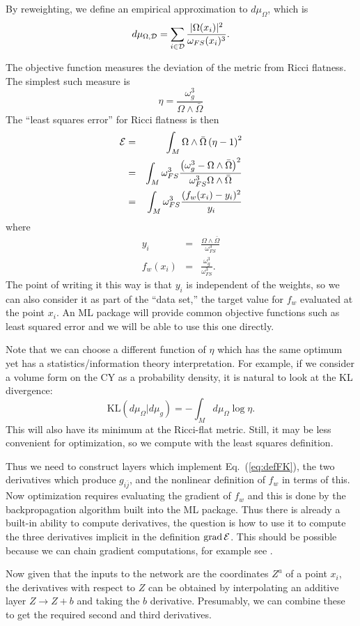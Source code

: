 \documentclass[12pt]{article}
\def\CD {{\cal D}}
\def\CE {{\cal E}}
\newcommand{\eq}[1]{Eq.~(\ref{eq:#1})}
\newcommand{\be}{\begin{equation}}
\newcommand{\ee}{\end{equation}}
\newcommand{\bea}{\begin{eqnarray}}
\newcommand{\eea}{\end{eqnarray}}
\def\bj{{\bar{j}}}
\begin{document}
By reweighting, we define an empirical approximation to $d\mu_\Omega$, which is
\be\label{eq:muOmegaD}
d\mu_{\Omega,\CD} = \sum_{i\in \CD} \frac{ |\Omega(x_i)|^2 }{ \omega_{FS}(x_i)^3 } .
\ee

The objective function measures the deviation of the metric from Ricci flatness.  The simplest such measure
is
\be
\eta = \frac{ \omega_g^3 }{ \Omega\wedge\bar\Omega }
\ee
The ``least squares error'' for Ricci flatness is then
\bea \label{eq:Lquad}
\CE &=& \int_M \Omega\wedge\bar\Omega \left(\eta-1\right)^2 \\
&=& \int_M \omega_{FS}^3 \frac{\left( \omega_g^3-\Omega\wedge\bar\Omega \right)^2 }{ 
\omega_{FS}^3 \Omega\wedge\bar\Omega } \\
&=& \int_M \omega_{FS}^3 \frac{(f_w(x_i) - y_i)^2}{y_i}
\label{eq:cyobj}
\eea
where
\bea
y_i &=& \frac{ \Omega\wedge\bar\Omega }{ \omega_{FS}^3 } \\
f_w(x_i) &=& \frac{ \omega_g^3 }{ \omega_{FS}^3 } .
\eea
The point of writing it this way is that $y_i$ is independent of the weights, so we can also consider
it as part of the ``data set,'' the target value for $f_w$ evaluated at the point $x_i$.  An ML package
will provide common objective functions such as least squared error and we will be able to use this one directly.

Note that we can choose a different function of $\eta$ which has the same optimum yet has
a statistics/information theory interpretation.  For example, if we consider a volume form on the CY as
a probability density, it is natural to look at the KL divergence:
\be \label{eq:KLobj}
\mbox{KL}\left( d\mu_\Omega | d\mu_g \right) = 
-\int_M d\mu_\Omega \log \eta .
\ee
This will also have its minimum at the Ricci-flat metric.
Still, it may be less convenient for optimization, so we compute with the least squares definition.

Thus we need to construct layers which implement \eq{defFK}, the two derivatives which produce $g_{i\bj}$,
and the nonlinear definition of $f_w$ in terms of this.  Now optimization requires evaluating the gradient
of $f_w$ and this is done by the backpropagation algorithm built into the ML package.  Thus there is already
a built-in ability to compute derivatives, the question is how to use it to compute the three derivatives
implicit in the definition $\mbox{grad}\, \CE$.  This should be possible because we can chain gradient
computations, for example see \cite{TFhessian}.

Now given that the inputs to the network are the coordinates $Z^a$ of a point $x_i$, the derivatives with
respect to $Z$ can be obtained by interpolating an additive layer $Z\rightarrow Z+b$ and taking the $b$
derivative.  Presumably, we can combine these to get the required second and third derivatives.
\end{document}
